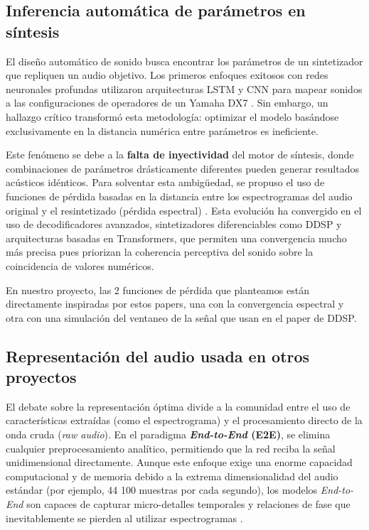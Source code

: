 \subsection{Inferencia automática de parámetros en síntesis}

El diseño automático de sonido busca encontrar los parámetros de un sintetizador que repliquen un audio objetivo. Los primeros enfoques exitosos con redes neuronales profundas utilizaron arquitecturas LSTM y CNN para mapear sonidos a las configuraciones de operadores de un Yamaha DX7 \citep{yee2018}. Sin embargo, un hallazgo crítico transformó esta metodología: optimizar el modelo basándose exclusivamente en la distancia numérica entre parámetros es ineficiente.

Este fenómeno se debe a la \textbf{falta de inyectividad} del motor de síntesis, donde combinaciones de parámetros drásticamente diferentes pueden generar resultados acústicos idénticos. Para solventar esta ambigüedad, se propuso el uso de funciones de pérdida basadas en la distancia entre los espectrogramas del audio original y el resintetizado (pérdida espectral) \citep{barkan2019}. Esta evolución ha convergido en el uso de decodificadores avanzados, sintetizadores diferenciables como DDSP \citep{engel2020} y arquitecturas basadas en Transformers, que permiten una convergencia mucho más precisa pues priorizan la coherencia perceptiva del sonido sobre la coincidencia de valores numéricos.

En nuestro proyecto, las 2 funciones de pérdida que planteamos están directamente inspiradas por estos papers, una con la convergencia espectral y otra con una simulación del ventaneo de la señal que usan en el paper de DDSP.

\subsection{Representación del audio usada en otros proyectos}

El debate sobre la representación óptima divide a la comunidad entre el uso de características extraídas (como el espectrograma) y el procesamiento directo de la onda cruda (\textit{raw audio}). En el paradigma \textbf{\textit{End-to-End} (E2E)}, se elimina cualquier preprocesamiento analítico, permitiendo que la red reciba la señal unidimensional directamente. Aunque este enfoque exige una enorme capacidad computacional y de memoria debido a la extrema dimensionalidad del audio estándar (por ejemplo, 44 100 muestras por cada segundo), los modelos \textit{End-to-End} son capaces de capturar micro-detalles temporales y relaciones de fase que inevitablemente se pierden al utilizar espectrogramas \citep{oord2016}. 

